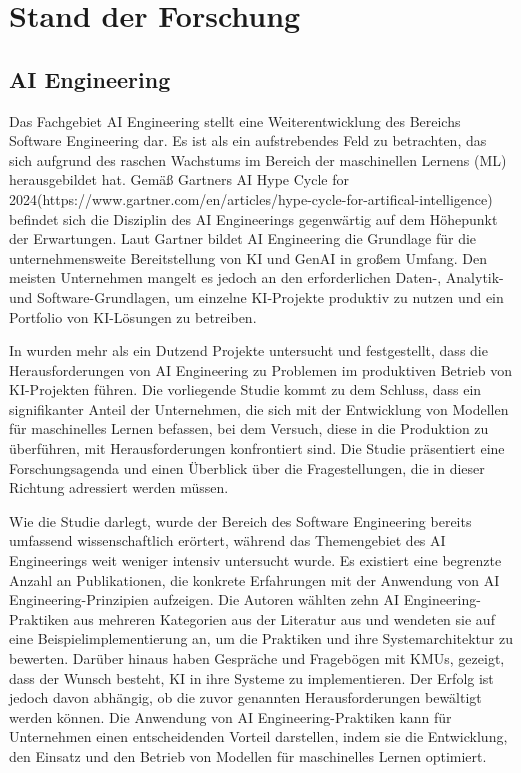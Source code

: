 \documentclass[11pt,a4paper,pointlessnumbers]{scrartcl}
\theoremstyle{break}
\numberwithin{equation}{section}
\begin{document}
\section{Stand der Forschung}
\subsection{AI Engineering}
Das Fachgebiet AI Engineering stellt eine Weiterentwicklung des Bereichs Software Engineering dar. Es ist als ein aufstrebendes Feld zu betrachten, das sich aufgrund des raschen Wachstums im Bereich der maschinellen Lernens (ML) herausgebildet hat. Gemäß Gartners \glqq AI Hype Cycle for 2024\grqq (https://www.gartner.com/en/articles/hype-cycle-for-artifical-intelligence) befindet sich die Disziplin des AI Engineerings gegenwärtig auf dem Höhepunkt der Erwartungen. Laut Gartner bildet AI Engineering die Grundlage für die unternehmensweite Bereitstellung von KI und GenAI in großem Umfang. Den meisten Unternehmen mangelt es jedoch an den erforderlichen Daten-, Analytik- und Software-Grundlagen, um einzelne KI-Projekte produktiv zu nutzen und ein Portfolio von KI-Lösungen zu betreiben. 

In \cite{boschEngineeringAISystems2021} wurden mehr als ein Dutzend Projekte untersucht und festgestellt, dass die Herausforderungen von AI Engineering zu Problemen im produktiven Betrieb von KI-Projekten führen. Die vorliegende Studie kommt zu dem Schluss, dass ein signifikanter Anteil der Unternehmen, die sich mit der Entwicklung von Modellen für maschinelles Lernen befassen, bei dem Versuch, diese in die Produktion zu überführen, mit Herausforderungen konfrontiert sind. Die Studie präsentiert eine Forschungsagenda und einen Überblick über die Fragestellungen, die in dieser Richtung adressiert werden müssen. 

Wie die Studie \cite{groteCaseStudyAI2023} darlegt, wurde der Bereich des Software Engineering bereits umfassend wissenschaftlich erörtert, während das Themengebiet des AI Engineerings weit weniger intensiv untersucht wurde. Es existiert eine begrenzte Anzahl an Publikationen, die konkrete Erfahrungen mit der Anwendung von AI Engineering-Prinzipien aufzeigen. Die Autoren wählten zehn AI Engineering-Praktiken aus mehreren Kategorien aus der Literatur aus und wendeten sie auf eine Beispielimplementierung an, um die Praktiken und ihre Systemarchitektur zu bewerten. Darüber hinaus haben Gespräche und Fragebögen mit KMUs, gezeigt, dass der Wunsch besteht, KI in ihre Systeme zu implementieren. Der Erfolg ist jedoch davon abhängig, ob die zuvor genannten Herausforderungen bewältigt werden können. Die Anwendung von AI Engineering-Praktiken kann für Unternehmen einen entscheidenden Vorteil darstellen, indem sie die Entwicklung, den Einsatz und den Betrieb von Modellen für maschinelles Lernen optimiert.
\end{document}
